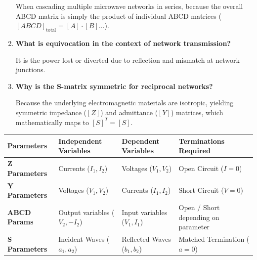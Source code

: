 \documentclass[12pt,a4paper]{article}
\newcommand{\Q}[1]{\textbf{#1}\par\noindent\ignorespaces}
\renewcommand{\arraystretch}{1.45}
\begin{document}
\begin{tcolorbox}[exambox, title={\textbf{Frequently Asked / Viva Questions}}]
\begin{enumerate}[topsep=0pt, label=\textbf{Q\arabic*.}, itemsep=5pt]
    When cascading multiple microwave networks in series, because the overall ABCD matrix is simply the product of individual ABCD matrices ($[ABCD]_{\text{total}} = [A] \cdot [B] \dots$).
  \item \Q{What is equivocation in the context of network transmission?}
    It is the power lost or diverted due to reflection and mismatch at network junctions.
  \item \Q{Why is the S-matrix symmetric for reciprocal networks?}
    Because the underlying electromagnetic materials are isotropic, yielding symmetric impedance ($[Z]$) and admittance ($[Y]$) matrices, which mathematically maps to $[S]^T = [S]$.
\end{enumerate}
\end{tcolorbox}

\begin{tcolorbox}[tikzbox, title={Comparison of Z, Y, ABCD, and S-Parameters}]
\renewcommand{\arraystretch}{1.4}
\par\noindent
{\renewcommand{\arraystretch}{1.65}%
\begin{tabularx}{\linewidth}{|B{2.8cm}|Y|Y|Y|}\hline
\textbf{Parameters} & \textbf{Independent Variables} & \textbf{Dependent Variables} & \textbf{Terminations Required} \\[4pt]
\hline
\textbf{Z Parameters} & Currents ($I_1, I_2$) & Voltages ($V_1, V_2$) & Open Circuit ($I = 0$) \\[4pt]
\hline
\textbf{Y Parameters} & Voltages ($V_1, V_2$) & Currents ($I_1, I_2$) & Short Circuit ($V = 0$) \\[4pt]
\hline
\textbf{ABCD Params} & Output variables ($V_2, -I_2$) & Input variables ($V_1, I_1$) & Open / Short depending on parameter \\[4pt]
\hline
\textbf{S Parameters} & Incident Waves ($a_1, a_2$) & Reflected Waves ($b_1, b_2$) & Matched Termination ($a = 0$) \\[4pt]
\hline
\end{tabularx}
}
\end{tcolorbox}
\end{document}
